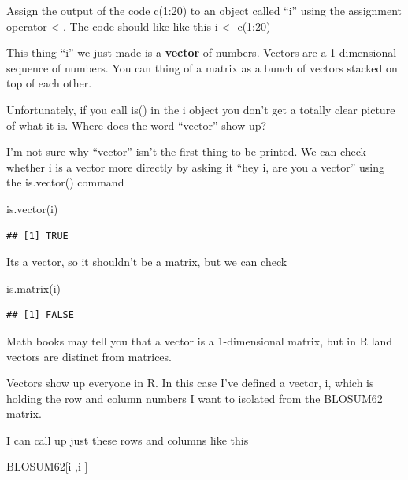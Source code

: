 \documentclass[
]{book}
\newenvironment{Shaded}{\begin{snugshade}}{\end{snugshade}}
\newcommand{\FunctionTok}[1]{\textcolor[rgb]{0.00,0.00,0.00}{#1}}
\newcommand{\NormalTok}[1]{#1}
\begin{document}
Assign the output of the code c(1:20) to an object called ``i'' using the assignment operator \textless-. The code should like like this i \textless- c(1:20)

This thing ``i'' we just made is a \textbf{vector} of numbers. Vectors are a 1 dimensional sequence of numbers. You can thing of a matrix as a bunch of vectors stacked on top of each other.

Unfortunately, if you call is() in the i object you don't get a totally clear picture of what it is. Where does the word ``vector'' show up?

I'm not sure why ``vector'' isn't the first thing to be printed. We can check whether i is a vector more directly by asking it ``hey i, are you a vector'' using the is.vector() command

\begin{Shaded}
\begin{Highlighting}[]
\FunctionTok{is.vector}\NormalTok{(i)}
\end{Highlighting}
\end{Shaded}

\begin{verbatim}
## [1] TRUE
\end{verbatim}

Its a vector, so it shouldn't be a matrix, but we can check

\begin{Shaded}
\begin{Highlighting}[]
\FunctionTok{is.matrix}\NormalTok{(i)}
\end{Highlighting}
\end{Shaded}

\begin{verbatim}
## [1] FALSE
\end{verbatim}

Math books may tell you that a vector is a 1-dimensional matrix, but in R land vectors are distinct from matrices.

Vectors show up everyone in R. In this case I've defined a vector, i, which is holding the row and column numbers I want to isolated from the BLOSUM62 matrix.

I can call up just these rows and columns like this

\begin{Shaded}
\begin{Highlighting}[]
\NormalTok{BLOSUM62[i ,i ]}
\end{Highlighting}
\end{Shaded}
\end{document}
